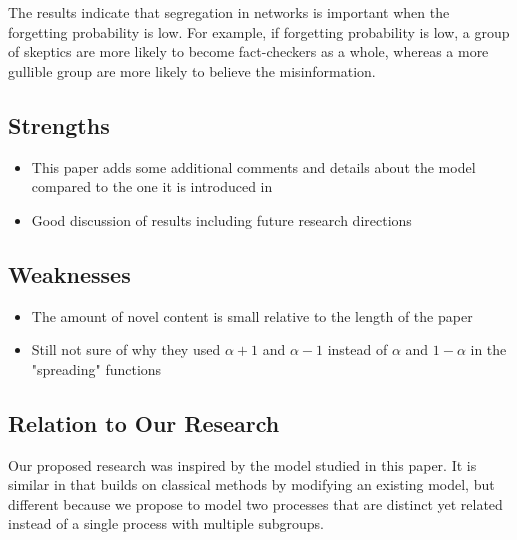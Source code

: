 \documentclass{article}
\begin{document}
    The results indicate that segregation in networks is important when the forgetting probability is low. For example, if forgetting probability is low, a group of skeptics are more likely to become fact-checkers as a whole, whereas a more gullible group are more likely to believe the misinformation.
    \subsection{Strengths}
    \begin{itemize}
        \item This paper adds some additional comments and details about the model compared to the one it is introduced in
        \item Good discussion of results including future research directions
    \end{itemize}
    
    \subsection{Weaknesses}
    \begin{itemize}
        \item The amount of novel content is small relative to the length of the paper
        \item Still not sure of why they used $\alpha + 1$ and $\alpha - 1$ instead of $\alpha$ and $1 - \alpha$ in the "spreading" functions
    \end{itemize}
    
    \subsection{Relation to Our Research}
    Our proposed research was inspired by the model studied in this paper. It is similar in that builds on classical methods by modifying an existing model, but different because we propose to model two processes that are distinct yet related instead of a single process with multiple subgroups. 
    \nocite{*}
    
    
\end{document}
